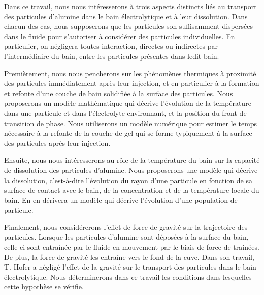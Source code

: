 
Dans ce travail, nous nous intéresserons à trois aspects distincts
liés au transport des particules d'alumine dans le bain électrolytique
et à leur dissolution. Dans chacun des cas, nous supposerons que les
particules son suffisamment dispersées dans le fluide pour
s'autoriser à considérer des particules individuelles. En particulier,
on négligera toutes interaction, directes ou indirectes par
l'intermédiaire du bain, entre les particules présentes dans ledit bain.

Premièrement, nous nous pencherons sur les phénomènes thermiques à
proximité des particules immédiatement après leur injection, et en
particulier à la formation et refonte d'une couche de bain solidifiée
à la surface des particules. Nous proposerons un modèle mathématique
qui décrive l'évolution de la température dans une particule et
dans l'électrolyte environnant, et la position du front de
transition de phase. Nous utiliserons un modèle numérique pour
estimer le temps nécessaire à la refonte de la couche de gel qui se
forme typiquement à la surface des particules après leur injection.

Ensuite, nous nous intéresserons au rôle de la température du bain sur
la capacité de dissolution des particules d'alumine. Nous proposerons
une modèle qui décrive la dissolution, c'est-à-dire l'évolution du
rayon d'une particule en fonction de sa surface de contact avec le
bain, de la concentration et de la température locale du bain. En en
dérivera un modèle qui décrive l'évolution d'une population de
particule.

Finalement, nous considérerons l'effet de force de gravité sur la
trajectoire des particules. Lorsque les particules d'alumine sont
déposées à la surface du bain, celle-ci sont entraînée par le fluide
en mouvement par le biais de force de trainées. De plus, la force de
gravité les entraîne vers le fond de la cuve. Dans son travail,
T. Hofer \cite{Hofer2011} a négligé l'effet de la gravité sur le
transport des particules dans le bain électrolytique. Nous
déterminerons dans ce travail les conditions dans lesquelles cette
hypothèse se vérifie.





